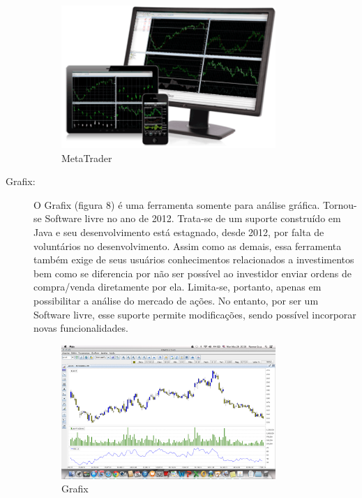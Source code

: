 \begin{description}
\begin{figure}[h!]
\centering
\label{f04}
\includegraphics[width=0.8\textwidth]{figuras/f04}
\caption{MetaTrader}
\end{figure}
\FloatBarrier


\item[Grafix:]

O Grafix (figura 8) é uma ferramenta somente para análise gráfica. Tornou-se Software livre no ano de 2012. Trata-se de um suporte construído em Java e seu desenvolvimento está estagnado, desde 2012, por falta de voluntários no desenvolvimento. Assim como as demais, essa ferramenta também exige de seus usuários conhecimentos relacionados a investimentos bem como se diferencia por não ser possível ao investidor enviar ordens de compra/venda diretamente por ela. Limita-se, portanto, apenas em possibilitar a análise do mercado de ações. No entanto, por ser um Software livre, esse suporte permite modificações, sendo possível incorporar novas funcionalidades.

\begin{figure}[h!]
\centering
\label{f05}
\includegraphics[width=0.8\textwidth]{figuras/f05}
\caption{Grafix}
\end{figure}
\FloatBarrier

\end{description}

